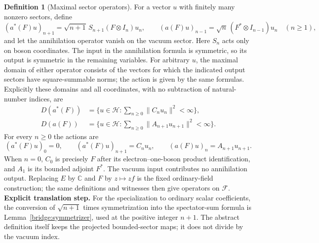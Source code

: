 \documentclass[11pt,a4paper]{article}
\theoremstyle{definition}
\newtheorem{definition}[theorem]{Definition}
\theoremstyle{remark}
\begin{document}
\begin{definition}[Maximal sector operators]
For a vector $u$ with finitely many nonzero sectors, define
\[
 (a^*(F)u)_{n+1}=\sqrt{n+1}\,S_{n+1}(F\otimes I_n)u_n,
 \qquad
 (a(F)u)_{n-1}=\sqrt n\,(F^*\otimes I_{n-1})u_n\quad(n\geq1),
\]
and let the annihilation operator vanish on the vacuum sector. Here $S_n$
acts only on boson coordinates. The input in the annihilation formula is
symmetric, so its output is symmetric in the remaining variables.
For arbitrary $u$, the maximal domain of either operator consists of the
vectors for which the indicated output sectors have square-summable norms;
the action is given by the same formulas.
Explicitly these domains and all coordinates, with no subtraction
of natural-number indices, are
\begin{align*}
 D(a^*(F))&=\{u\in\mathcal H:\sum_{n\geq0}\|C_nu_n\|^2<\infty\},\\
 D(a(F))&=\{u\in\mathcal H:\sum_{n\geq0}\|A_{n+1}u_{n+1}\|^2<\infty\}.
\end{align*}
For every $n\geq0$ the actions are
\[
 (a^*(F)u)_0=0,\qquad (a^*(F)u)_{n+1}=C_nu_n,\qquad
 (a(F)u)_n=A_{n+1}u_{n+1}.
\]
When $n=0$, $C_0$ is precisely $F$ after its electron--one-boson
product identification, and $A_1$ is its bounded adjoint $F^*$.
The vacuum input contributes no annihilation output. Replacing
$E$ by $\mathbb C$ and $F$ by $z\mapsto zf$ is the fixed
ordinary-field construction; the same definitions and witnesses
then give operators on $\mathcal F$.
\noindent\textbf{Explicit translation step.} For the specialization to ordinary scalar coefficients, the conversion
of $\sqrt{n+1}$ times symmetrization into the spectator-sum formula is
Lemma~\ref{bridge:symmetrizer}, used at the positive integer $n+1$.
The abstract definition itself keeps the projected bounded-sector maps;
it does not divide by the vacuum index.

\end{definition}
\end{document}
